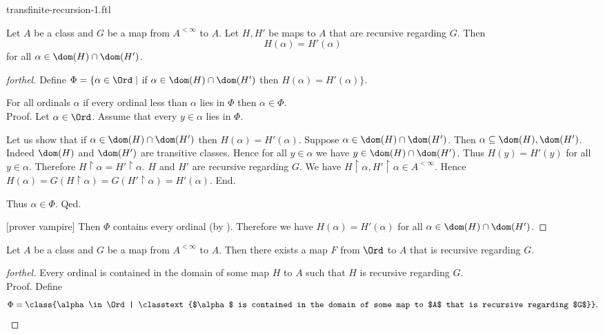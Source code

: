 \documentclass{naproche-library}
\begin{document}
\begin{smodule}{transfinite-recursion-1.ftl}

  \begin{lemma*}[forthel,title=Coincidence Lemma,id=transfinite-recursion_coincidence]
    Let $A$ be a class and $G$ be a map from $A^{< \infty}$ to $A$.
    Let $H, H'$ be maps to $A$ that are recursive regarding $G$.
    Then \[ H(\alpha) = H'(\alpha) \] for all $\alpha \in \dom(H) \cap \dom(H')$.
  \end{lemma*}
  \begin{proof}[forthel]
    Define $\Phi = \{ \alpha \in \Ord \mid$ if
    $\alpha \in \dom(H) \cap \dom(H')$ then $H(\alpha) = H'(\alpha) \}$.

    For all ordinals $\alpha$ if every ordinal less than $\alpha$ lies in $\Phi$ then $\alpha \in \Phi$. \\
    Proof.
      Let $\alpha \in \Ord$.
      Assume that every $y \in \alpha$ lies in $\Phi$.

      Let us show that if $\alpha \in \dom(H) \cap \dom(H')$ then
      $H(\alpha) = H'(\alpha)$.
        Suppose $\alpha \in \dom(H) \cap \dom(H')$.
        Then $\alpha \subseteq \dom(H), \dom(H')$.
        Indeed $\dom(H)$ and $\dom(H')$ are transitive classes.
        Hence for all $y \in \alpha$ we have $y \in \dom(H) \cap \dom(H')$.
        Thus $H(y) = H'(y)$ for all $y \in \alpha$.
        Therefore $H \restriction \alpha = H' \restriction \alpha$.
        $H$ and $H'$ are recursive regarding $G$.
        We have $H \restriction \alpha, H' \restriction \alpha \in A^{< \infty}$.
        Hence $H(\alpha)
          = G(H \restriction \alpha)
          = G(H' \restriction \alpha)
          = H'(\alpha)$.
      End.

      Thus $\alpha \in \Phi$.
    Qed.

    [prover vampire]
    Then $\Phi$ contains every ordinal (by ).
    Therefore we have $H(\alpha) = H'(\alpha)$ for all $\alpha \in \dom(H) \cap \dom(H')$.
  \end{proof}
  
  \begin{theorem*}[forthel,title=Transfinite Recursion Theorem: Existence,id=transfinite-recursion_existence]
    Let $A$ be a class and $G$ be a map from $A^{< \infty}$ to $A$.
    Then there exists a map $F$ from $\Ord$ to $A$ that is recursive regarding $G$.
  \end{theorem*}
  \begin{proof}[forthel]
    Every ordinal is contained in the domain of some map $H$ to $A$ such that $H$ is recursive regarding $G$. \\
    Proof.
      Define \[ \Phi = \class{\alpha \in \Ord | \classtext{$\alpha$ is contained in the domain of some map to $A$ that is recursive regarding $G$}}. \]


\end{proof}
\end{smodule}
\end{document}
